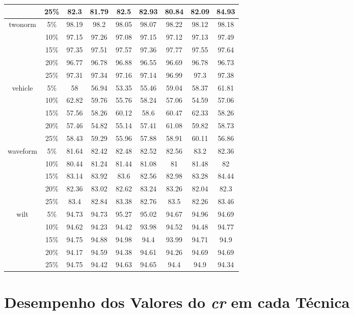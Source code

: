 \begin{longtable}[c]{|c|c|c|c|c|c|c|c|c|}
& 25\% & 82.3 & 81.79 & 82.5 & 82.93 & 80.84 & 82.09 & 84.93 \\ \hline
\multirow{5}{*}{twonorm}
& 5\% & 98.19 & 98.2 & 98.05 & 98.07 & 98.22 & 98.12 & 98.18 \\ 
& 10\% & 97.15 & 97.26 & 97.08 & 97.15 & 97.12 & 97.13 & 97.49 \\
& 15\% & 97.35 & 97.51 & 97.57 & 97.36 & 97.77 & 97.55 & 97.64 \\
& 20\% & 96.77 & 96.78 & 96.88 & 96.55 & 96.69 & 96.78 & 96.73 \\
& 25\% & 97.31 & 97.34 & 97.16 & 97.14 & 96.99 & 97.3 & 97.38 \\ \hline
\multirow{5}{*}{vehicle}
& 5\% & 58 & 56.94 & 53.35 & 55.46 & 59.04 & 58.37 & 61.81 \\ 
& 10\% & 62.82 & 59.76 & 55.76 & 58.24 & 57.06 & 54.59 & 57.06 \\
& 15\% & 57.56 & 58.26 & 60.12 & 58.6 & 60.47 & 62.33 & 58.26 \\
& 20\% & 57.46 & 54.82 & 55.14 & 57.41 & 61.08 & 59.82 & 58.73 \\
& 25\% & 58.43 & 59.29 & 55.96 & 57.88 & 58.91 & 60.11 & 56.86 \\ \hline
\multirow{5}{*}{waveform}
& 5\% & 81.64 & 82.42 & 82.48 & 82.52 & 82.56 & 83.2 & 82.36 \\ 
& 10\% & 80.44 & 81.24 & 81.44 & 81.08 & 81 & 81.48 & 82 \\
& 15\% & 83.14 & 83.92 & 83.6 & 82.56 & 82.98 & 83.28 & 84.44 \\
& 20\% & 82.36 & 83.02 & 82.62 & 83.24 & 83.26 & 82.04 & 82.3 \\
& 25\% & 83.4 & 82.84 & 83.38 & 82.76 & 83.5 & 82.26 & 83.46 \\ \hline
\multirow{5}{*}{wilt}
& 5\% & 94.73 & 94.73 & 95.27 & 95.02 & 94.67 & 94.96 & 94.69 \\ 
& 10\% & 94.62 & 94.23 & 94.42 & 93.98 & 94.52 & 94.48 & 94.77 \\
& 15\% & 94.75 & 94.88 & 94.98 & 94.4 & 93.99 & 94.71 & 94.9 \\
& 20\% & 94.17 & 94.59 & 94.38 & 94.61 & 94.26 & 94.69 & 94.69 \\
& 25\% & 94.75 & 94.42 & 94.63 & 94.65 & 94.4 & 94.9 & 94.34 \\ \hline
\end{longtable}
\normalsize

    \chapter{Desempenho dos Valores do \textit{cr} em cada Técnica}
    	\label{apen:cr-technical}

